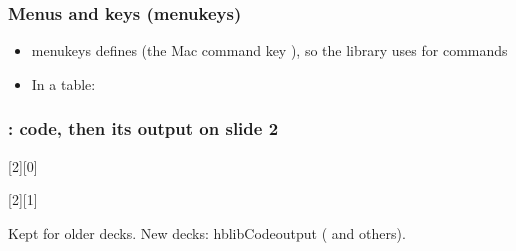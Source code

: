 \documentclass[aspectratio=169,10pt,compress]{beamer}
\begin{document}
\begin{frame}[t,fragile] \frametitle{Menus and keys (menukeys)}

\begin{texcode}
            
\end{texcode}

	\begin{center}
		 \quad {} \quad {} \quad {}
	\end{center}

	\begin{itemize}\small
		\item menukeys defines  (the Mac command key \keys{\cmd}),
		so the library uses  for commands
		\item In a table: \win\  \quad \mac\ 
	\end{itemize}
\end{frame}








\begin{frame}[t,fragile] \frametitle{: code, then its output on slide 2}

\begin{texcode}
[2][0]     %
\renewcommand{\hCodeOutputWidth}{5cm}   %
\end{texcode}

	[1]

	\vspace{1em}
	\small Kept for older decks. New decks: hblibCodeoutput ( and others).
\end{frame}
\end{document}
